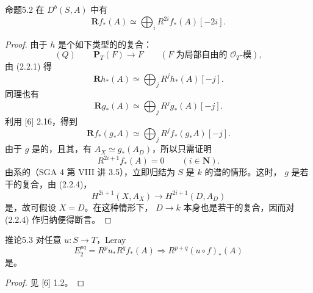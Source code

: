 \begin{SGAresult}{命题}{5.2}
在 $D^b(S,A)$ 中有
\[
 \mathbf Rf_*(A)\simeq\bigoplus_iR^{2i}f_*(A)[-2i].
\]
\end{SGAresult}
\begin{proof}
由于 $h$ 是个如下类型的的复合：
\[
 (Q)\qquad \mathbf P_T(F)\longrightarrow F
 \qquad(F\text{ 为局部自由的 }\mathscr O_T\text{-模}),
\]
由 (2.2.1) 得
\[
 \mathbf Rh_*(A)\simeq\bigoplus_jR^jh_*(A)[-j].
\]
同理也有
\[
 \mathbf Rg_*(A)\simeq\bigoplus_jR^jg_*(A)[-j].
\]
利用 [6] 2.16，得到
\[
 \mathbf Rf_*(g_*A)\simeq\bigoplus_jR^jf_*(g_*A)[-j].
\]
由于 $g$ 是的，且其，有 $A_X\simeq g_*(A_D)$，所以只需证明
\[
 R^{2i+1}f_*(A)=0\qquad(i\in\mathbf N).\tag{5.2.1}
\]
由系的（SGA 4 第 VIII 讲 3.5），立即归结为 $S$ 是 $k$ 的谱的情形。这时， $g$ 是若干的复合，由 (2.2.4)，
\[
 H^{2i+1}(X,A_X)\longrightarrow H^{2i+1}(D,A_D)
\]
是，故可假设 $X=D$。在这种情形下，
 $D\to k$ 本身也是若干的复合，因而对 (2.2.4) 作归纳便得断言。
\end{proof}

\begin{SGAresult}{推论}{5.3}
对任意 $u:S\to T$，Leray 
\[
 E_2^{pq}=R^pu_*R^qf_*(A)\Longrightarrow R^{p+q}(u\circ f)_*(A)
\]
是。
\end{SGAresult}
\begin{proof}
见 [6] 1.2。
\end{proof}

